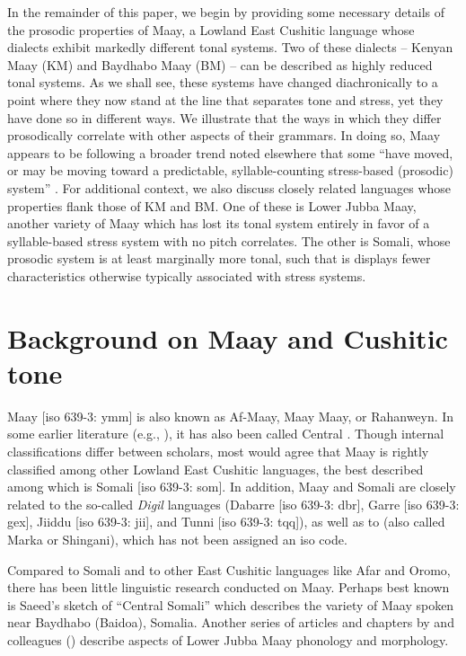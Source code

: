 \documentclass[output=paper,colorlinks,citecolor=brown]{langscibook}
\begin{document}
In the remainder of this paper, we begin by providing some necessary details of the prosodic properties of Maay, a Lowland East Cushitic language whose dialects exhibit markedly different tonal systems. Two of these dialects -- Kenyan Maay (KM) and Baydhabo Maay (BM) -- can be described as highly reduced tonal systems. As we shall see, these systems have changed diachronically to a point where they now stand at the line that separates tone and stress, yet they have done so in different ways. We illustrate that the ways in which they differ prosodically correlate with other aspects of their grammars. In doing so, Maay appears to be following a broader trend noted elsewhere that some  ``have moved, or may be moving toward a predictable, syllable-counting stress-based (prosodic) system'' \citep{Appleyard1991}. For additional context, we also discuss closely related languages whose properties flank those of KM and BM. One of these is Lower Jubba Maay, another variety of Maay which has lost its tonal system entirely in favor of a syllable-based stress system with no pitch correlates. The other is Somali, whose prosodic system is at least marginally more tonal, such that is displays fewer characteristics otherwise typically associated with stress systems.

\section{Background on Maay and Cushitic tone}

Maay [iso 639-3: ymm] is also known as Af-Maay, Maay Maay, or Rahanweyn. In some earlier literature (e.g., \citealt{Biber1982,Saeed1982}), it has also been called Central . Though internal classifications differ between scholars, most would agree that Maay is rightly classified among other Lowland East Cushitic languages, the best described among which is Somali [iso 639-3: som]. In addition, Maay and Somali are closely related to the  so-called \textit{Digil} languages (Dabarre [iso 639-3: dbr], Garre [iso 639-3: gex], Jiiddu [iso 639-3: jii], and Tunni [iso 639-3: tqq]), as well as to  (also called Marka or Shingani), which has not been assigned an iso code. 

Compared to Somali and to other East Cushitic languages like Afar and Oromo, there has been little linguistic research conducted on Maay. Perhaps best known is Saeed's \citeyearpar{Saeed1982} sketch of ``Central Somali'' which describes the variety of Maay spoken near Baydhabo (Baidoa), Somalia. Another series of articles and chapters by \citet{paster07,OptionalmultiplepluralmarkinginMaayPaster10,Paster2018} and colleagues (\citealt{ComfortPaster2009,PasterRanero2015}) describe aspects of Lower Jubba Maay phonology and morphology. 
\end{document}
